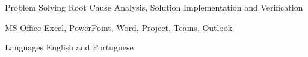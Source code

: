 


\begin{cvskills}


\cvskill
{Problem Solving} %
{Root Cause Analysis, Solution Implementation and Verification} %


\cvskill
{MS Office} %
{Excel, PowerPoint, Word, Project, Teams, Outlook} %


\cvskill
{Languages} %
{English and Portuguese} %


\end{cvskills}

